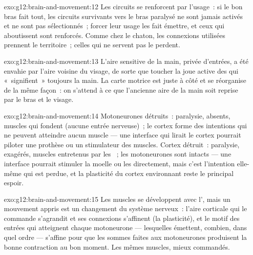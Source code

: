\begin{solution}{exo:g12:brain-and-movement:12}
Les circuits se renforcent par l'usage~: si le bon bras fait tout, les
circuits survivants vers le bras paralysé ne sont jamais activés et ne
sont pas sélectionnés~; forcer leur usage les fait émettre, et ceux
qui aboutissent sont renforcés. Comme chez le chaton, les connexions
utilisées prennent le territoire~; celles qui ne servent pas le
perdent.
\end{solution}

\begin{solution}{exo:g12:brain-and-movement:13}
L'aire sensitive de la main, privée d'entrées, a été envahie par
l'aire voisine du visage, de sorte que toucher la joue active des
 qui «~signifient~» toujours la main. La carte motrice est
juste à côté et se réorganise de la même façon~: on s'attend à ce que
l'ancienne aire de la main soit reprise par le bras et le visage.
\end{solution}

\begin{solution}{exo:g12:brain-and-movement:14}
Motoneurones détruits~: paralysie,  absents, muscles qui
fondent (aucune entrée nerveuse)~; le cortex forme des intentions qui
ne peuvent atteindre aucun muscle --- une interface qui lirait le
cortex pourrait piloter une prothèse ou un stimulateur des muscles.
Cortex détruit~: paralysie,  exagérés, muscles entretenus par
les ~; les motoneurones sont intacts --- une interface
pourrait stimuler la moelle ou les  directement, mais c'est
l'intention elle-même qui est perdue, et la plasticité du cortex
environnant reste le principal espoir.
\end{solution}

\begin{solution}{exo:g12:brain-and-movement:15}
Les muscles se développent avec l', mais un mouvement
appris est un changement du système nerveux~: l'aire corticale qui le
commande s'agrandit et ses connexions s'affinent (la plasticité), et
le motif des entrées qui atteignent chaque motoneurone --- lesquelles
émettent, combien, dans quel ordre --- s'affine pour que les sommes
faites aux motoneurones produisent la bonne contraction au bon moment.
Les mêmes muscles, mieux commandés.
\end{solution}

